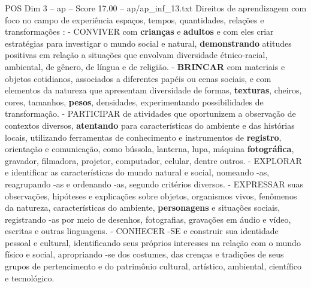 \begin{textsample}{POS Dim 3 – ap – Score 17.00 – ap/ap\_inf\_13.txt}
Direitos de aprendizagem com foco no campo de experiência espaços, tempos, quantidades, relações e transformações : - CONVIVER com \textbf{crianças} e \textbf{adultos} e com eles criar estratégias para investigar o mundo social e natural, \textbf{demonstrando} atitudes positivas em relação a situações que envolvam diversidade étnico-racial, ambiental, de gênero, de língua e de religião. - \textbf{BRINCAR} com materiais e objetos cotidianos, associados a diferentes papéis ou cenas sociais, e com elementos da natureza que apresentam diversidade de formas, \textbf{texturas}, cheiros, cores, tamanhos, \textbf{pesos}, densidades, experimentando possibilidades de transformação. - PARTICIPAR de atividades que oportunizem a observação de contextos diversos, \textbf{atentando} para características do ambiente e das histórias locais, utilizando ferramentas de conhecimento e instrumentos de \textbf{registro}, orientação e comunicação, como bússola, lanterna, lupa, máquina \textbf{fotográfica}, gravador, filmadora, projetor, computador, celular, dentre outros. - EXPLORAR e identificar as características do mundo natural e social, nomeando -as, reagrupando -as e ordenando -as, segundo critérios diversos. - EXPRESSAR suas observações, hipóteses e explicações sobre objetos, organismos vivos, fenômenos da natureza, características do ambiente, \textbf{personagens} e situações sociais, registrando -as por meio de desenhos, fotografias, gravações em áudio e vídeo, escritas e outras linguagens. - CONHECER -SE e construir sua identidade pessoal e cultural, identificando seus próprios interesses na relação com o mundo físico e social, apropriando -se dos costumes, das crenças e tradições de seus grupos de pertencimento e do patrimônio cultural, artístico, ambiental, científico e tecnológico.

\end{textsample}
